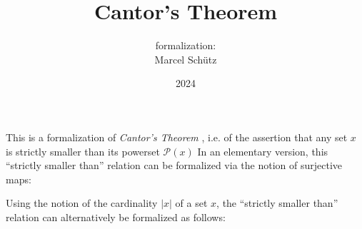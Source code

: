 \documentclass{article}
\title{Cantor's Theorem}
\author{\Naproche formalization: \vspace{0.5em} \\
Marcel Schütz}
\date{2024}
\newcommand\pow{\mathcal P}
\newcommand\card[1]{|#1|}
\begin{document}
  \maketitle

  \noindent This is a formalization of \emph{Cantor's Theorem}
  \cite{Cantor1891}, i.e. of the assertion that any set $x$ is strictly smaller
  than its powerset $\pow(x)$
  In an elementary version, this ``strictly smaller than'' relation can be
  formalized via the notion of surjective maps:


  Using the notion of the cardinality $\card{x}$ of a set $x$, the
  ``strictly smaller than'' relation can alternatively be formalized as follows:


  \printbibliography
\end{document}
